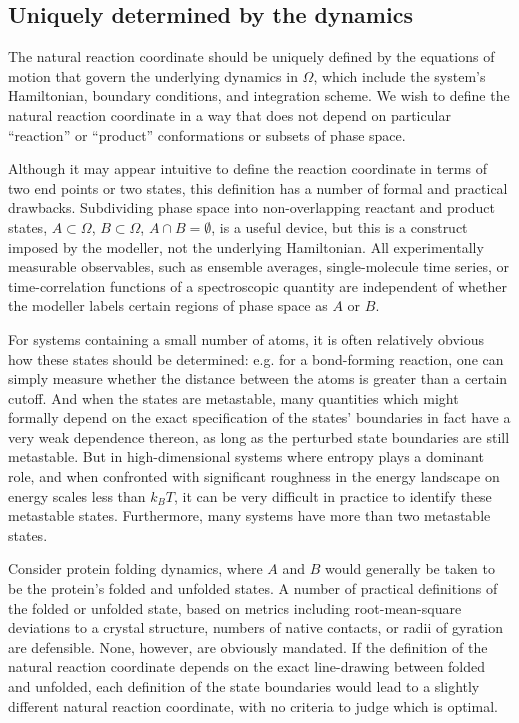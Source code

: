 \documentclass[aip, jcp, reprint, nolinenumbers, twocolumn, nobalancelastpage]{revtex4-1} %
\begin{document}
\subsection{Uniquely determined by the dynamics}
\label{sect:uniquely_dertmined}

The natural reaction coordinate should be uniquely defined by the equations of motion that govern the underlying dynamics in $\Omega$, which include the system's Hamiltonian, boundary conditions, and integration scheme. We wish to define the natural reaction coordinate in a way that does not depend on particular ``reaction'' or ``product'' conformations or subsets of phase space.

Although it may appear intuitive to define the reaction coordinate in terms of two end points or two states, this definition has a number of formal and practical drawbacks. Subdividing phase space into non-overlapping reactant and product states, $A \subset \Omega$, $B \subset \Omega$, $A \cap B = \emptyset$, is a useful device, but this is a construct imposed by the modeller, not the underlying Hamiltonian. All experimentally measurable observables, such as ensemble averages, single-molecule time series, or time-correlation functions of a spectroscopic quantity are independent of whether the modeller labels certain regions of phase space as $A$ or $B$.


For systems containing a small number of atoms, it is often relatively obvious how these states should be determined: e.g. for a bond-forming reaction, one can simply measure whether the distance between the atoms is greater than a certain cutoff. And when the states are metastable, many quantities which might formally depend on the exact specification of the states' boundaries in fact have a very weak dependence thereon, as long as the perturbed state boundaries are still metastable.\cite{hummer2004from} But in high-dimensional systems where entropy plays a dominant role, and when confronted with significant roughness in the energy landscape on energy scales less than $k_BT$, it can be very difficult in practice to identify these metastable states. Furthermore, many systems have more than two metastable states.

Consider protein folding dynamics, where $A$ and $B$ would generally be taken to be the protein's folded and unfolded states. A number of practical definitions of the folded or unfolded state, based on metrics including root-mean-square deviations to a crystal structure, numbers of native contacts, or radii of gyration are defensible. None, however, are obviously mandated. If the definition of the natural reaction coordinate depends on the exact line-drawing between folded and unfolded, each definition of the state boundaries would lead to a slightly different natural reaction coordinate, with no criteria to judge which is optimal.
\end{document}
